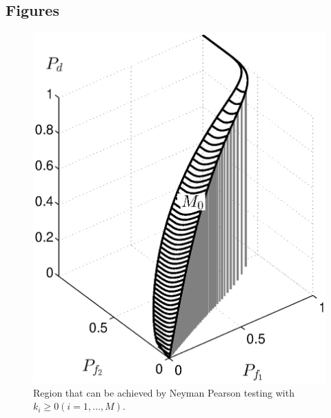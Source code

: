 \documentclass[12pt,journal,a4paper,twoside,onecolumn]{IEEEtran}
\begin{document}
\begin{spacing}{2.5}
\section{Figures}
\newpage

\begin{figure}[!t]
\centering
\includegraphics[width=12cm]{singleROC.eps}
\caption{Region that can be achieved by Neyman Pearson testing with $k_i \geq 0 (i=1, ..., M)$.}
\label{pic: surface for m0 gaussian}
\end{figure}
\newpage


\end{spacing}
\end{document}
